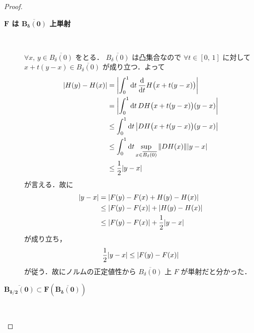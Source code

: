 \documentclass[TQFT_main]{subfiles}
\begin{document}
\begin{proof}
    \begin{description}
        \item[\textbf{$\bm{F}$ は $\bm{\overline{B_\delta(0)}}$ 上単射}]　
        
        $\forall x,\, y \in \overline{B_\delta(0)}$ をとる．
        $\overline{B_\delta(0)}$ は凸集合なので $\forall t \in [0,\, 1]$ に対して $x + t(y - x) \in \overline{B_\delta(0)}$ が成り立つ．よって
        \begin{align}
            \abs{H(y) - H(x)} 
            &= \abs{\int_0^1 \dd{t} \dv{}{t} H\bigl(x + t(y - x)\bigr)} \\
            &= \abs{\int_0^1 \dd{t} DH \bigl( x + t(y - x) \bigr) (y - x)} \\
            &\le \int_0^1 \dd{t} \abs{DH \bigl( x + t(y - x) \bigr) (y - x)} \\
            &\le \int_0^1 \dd{t} \sup_{x \in \overline{B_\delta(0)}} \norm{DH(x)} \abs{y-x} \\
            &\le \frac{1}{2} \abs{y-x} \label{ineq:thm-inv-1}
        \end{align}
        が言える．故に
        \begin{align}
            \abs{y - x} 
            &= \abs{F(y) - F(x) + H(y) - H(x)} \\
            &\le \abs{F(y) - F(x)} + \abs{H(y) - H(x)} \\
            &\le \abs{F(y) - F(x)} + \frac{1}{2}\abs{y - x}
        \end{align}
        が成り立ち，
        \begin{align}
            \label{ineq:thm-inv-2}
            \frac{1}{2} \abs{y - x} \le \abs{F(y) - F(x)}
        \end{align}
        が従う．故にノルムの正定値性から $\overline{B_\delta(0)}$ 上 $F$ が単射だと分かった．
        
        \item[$\bm{\overline{B_{\delta/2}(0)} \subset F(\overline{B_\delta(0)})}$]　
        

\end{description}
\end{proof}
\end{document}
